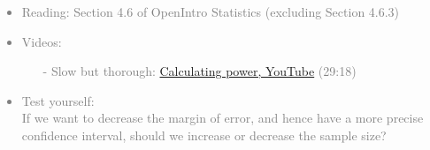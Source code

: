 \documentclass[11pt]{article}
\newcommand{\gray}[1]{\textcolor{gray}{#1}}
\begin{document}
\gray{
{\it
\vspace{-0.5cm}
\begin{itemize}
\renewcommand{\labelitemi}{{\textcolor{dark}{$\ast$}}}
\item Reading: Section 4.6 of OpenIntro Statistics (excluding Section 4.6.3)
\item Videos:
\begin{itemize}
\item[-] Slow but thorough: \href{http://www.youtube.com/watch?v=QW9_T8nrApU}{Calculating power, YouTube} (29:18)
\end{itemize}
\item Test yourself: \\
{\small
If we want to decrease the margin of error, and hence have a more precise confidence interval, should we increase or decrease the sample size?
}
\end{itemize}
}}
\end{document}
